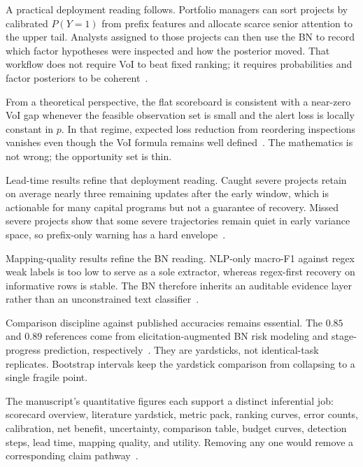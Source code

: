 A practical deployment reading follows. Portfolio managers can sort projects by calibrated $P(Y{=}1)$ from prefix features and allocate scarce senior attention to the upper tail. Analysts assigned to those projects can then use the BN to record which factor hypotheses were inspected and how the posterior moved. That workflow does not require VoI to beat fixed ranking; it requires probabilities and factor posteriors to be coherent~\cite{Vickers2006,Luu2009}.

From a theoretical perspective, the flat scoreboard is consistent with a near-zero VoI gap whenever the feasible observation set is small and the alert loss is locally constant in $p$. In that regime, expected loss reduction from reordering inspections vanishes even though the VoI formula remains well defined~\cite{Howard1966,Song2021,Malings2016}. The mathematics is not wrong; the opportunity set is thin.

Lead-time results refine that deployment reading. Caught severe projects retain on average nearly three remaining updates after the early window, which is actionable for many capital programs but not a guarantee of recovery. Missed severe projects show that some severe trajectories remain quiet in early variance space, so prefix-only warning has a hard envelope~\cite{Tagharobi2025,Egwim2021}.

Mapping-quality results refine the BN reading. NLP-only macro-F1 against regex weak labels is too low to serve as a sole extractor, whereas regex-first recovery on informative rows is stable. The BN therefore inherits an auditable evidence layer rather than an unconstrained text classifier~\cite{Onisko2001,Woldesenbet2016}.

Comparison discipline against published accuracies remains essential. The $0.85$ and $0.89$ references come from elicitation-augmented BN risk modeling and stage-progress prediction, respectively~\cite{Khodabakhshian2025,Tagharobi2025}. They are yardsticks, not identical-task replicates. Bootstrap intervals keep the yardstick comparison from collapsing to a single fragile point.

The manuscript's quantitative figures each support a distinct inferential job: scorecard overview, literature yardstick, metric pack, ranking curves, error counts, calibration, net benefit, uncertainty, comparison table, budget curves, detection steps, lead time, mapping quality, and utility. Removing any one would remove a corresponding claim pathway~\cite{Gneiting2007,Vickers2006,Saito2015}.

